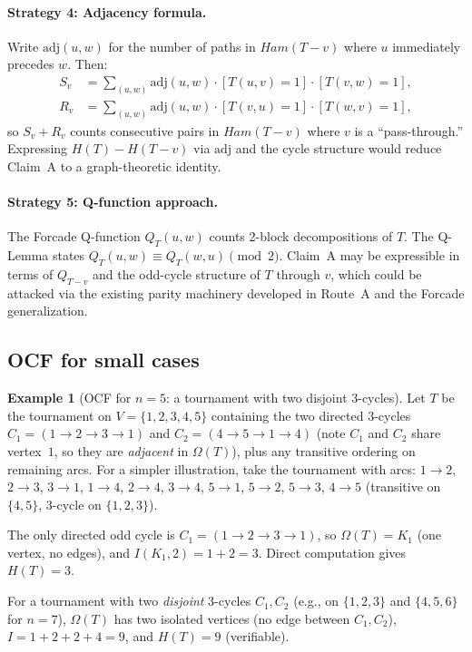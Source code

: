 \documentclass[12pt,reqno]{amsart}
\theoremstyle{plain}
\theoremstyle{definition}
\newtheorem{example}[theorem]{Example}
\theoremstyle{remark}
\newcommand{\Ham}{\mathrm{Ham}}
\renewcommand{\Ham}{Ham}%
\begin{document}
\paragraph{Strategy 4: Adjacency formula.}
Write $\mathrm{adj}(u,w)$ for the number of paths in $\Ham(T{-}v)$ where
$u$ immediately precedes $w$. Then:
\begin{align*}
  S_v &= \sum_{(u,w)} \mathrm{adj}(u,w) \cdot [T(u,v)=1] \cdot [T(v,w)=1],\\
  R_v &= \sum_{(u,w)} \mathrm{adj}(u,w) \cdot [T(v,u)=1] \cdot [T(w,v)=1],
\end{align*}
so $S_v + R_v$ counts consecutive pairs in $\Ham(T{-}v)$ where $v$ is a
``pass-through.'' Expressing $H(T) - H(T{-}v)$ via $\mathrm{adj}$
and the cycle structure would reduce Claim~A to a graph-theoretic identity.

\paragraph{Strategy 5: Q-function approach.}
The Forcade Q-function $Q_T(u,w)$ counts 2-block decompositions of $T$. The
Q-Lemma states $Q_T(u,w) \equiv Q_T(w,u) \pmod 2$. Claim~A may be expressible
in terms of $Q_{T{-}v}$ and the odd-cycle structure of $T$ through $v$, which
could be attacked via the existing parity machinery developed in Route~A and
the Forcade generalization.

\subsection{OCF for small cases}

\begin{example}[OCF for $n=5$: a tournament with two disjoint 3-cycles]\label{ex:ocf_n5}
Let $T$ be the tournament on $V=\{1,2,3,4,5\}$ containing the two directed
3-cycles $C_1=(1\to2\to3\to1)$ and $C_2=(4\to5\to1\to4)$ (note $C_1$ and $C_2$
share vertex~$1$, so they are \emph{adjacent} in $\Omega(T)$), plus any
transitive ordering on remaining arcs. For a simpler illustration, take the
tournament with arcs: $1\to2$, $2\to3$, $3\to1$, $1\to4$, $2\to4$, $3\to4$,
$5\to1$, $5\to2$, $5\to3$, $4\to5$ (transitive on $\{4,5\}$, 3-cycle on $\{1,2,3\}$).

The only directed odd cycle is $C_1=(1\to2\to3\to1)$, so
$\Omega(T)=K_1$ (one vertex, no edges), and
$I(K_1,2)=1+2=3$.
Direct computation gives $H(T)=3$. \checkmark

For a tournament with two \emph{disjoint} 3-cycles $C_1,C_2$ (e.g., on
$\{1,2,3\}$ and $\{4,5,6\}$ for $n=7$), $\Omega(T)$ has two isolated vertices
(no edge between $C_1,C_2$), $I=1+2+2+4=9$, and $H(T)=9$ (verifiable).
\end{example}
\end{document}
